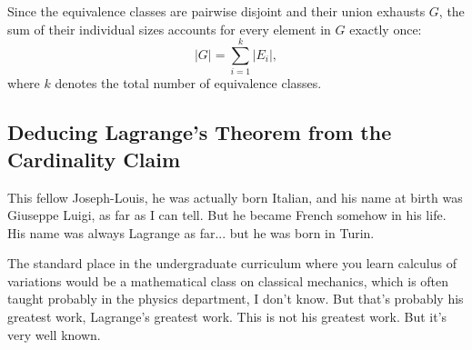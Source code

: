 \begin{content}
\begin{center}
\end{center}

Since the equivalence classes are pairwise disjoint and their union exhausts $G$, the sum of their individual sizes accounts for every element in $G$ exactly once:
\begin{equation}\label{eq:counting-classes}
|G| = \sum_{i=1}^k |E_i|,
\end{equation}
where $k$ denotes the total number of equivalence classes.
\end{content}

\subsection{Deducing Lagrange's Theorem from the Cardinality Claim}

\begin{speech}[00:20:33 - 00:21:22]
This fellow Joseph-Louis, he was actually born Italian, and his name at birth was Giuseppe Luigi, as far as I can tell. But he became French somehow in his life. His name was always Lagrange as far... but he was born in Turin.

The standard place in the undergraduate curriculum where you learn calculus of variations would be a mathematical class on classical mechanics, which is often taught probably in the physics department, I don't know. But that's probably his greatest work, Lagrange's greatest work. This is not his greatest work. But it's very well known.
\end{speech}

